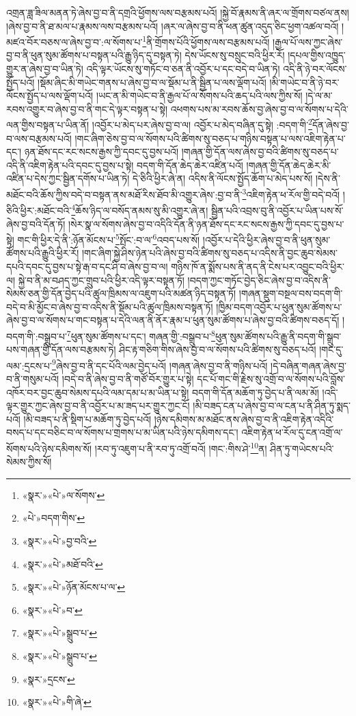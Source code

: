 འགྲན་ཟླ་ཟིལ་མནན་ཏེ་ཞེས་བྱ་བ་ནི་དགྲའི་ཕྱོགས་ལས་བརྩམས་པའོ། །སྐྱེ་བོ་རྣམས་ནི་ཞར་ལ་གྲོགས་བཙལ་ནས། །ཞེས་བྱ་བ་ནི་ཐ་མལ་པ་རྣམས་ལས་བརྩམས་པའོ། །ཞར་ལ་ཞེས་བྱ་བ་ནི་ཕན་ཚུན་འདུད་ཅིང་ཕྱག་འཚལ་བའོ། །མཛའ་བོར་བཅས་ལ་ཞེས་བྱ་བ་:ལ་སོགས་པ་\footnote{«སྣར་»«པེ་»ལ་སོགས་}ནི་གྲོགས་པོའི་ཕྱོགས་ལས་བརྩམས་པའོ། །རྒྱལ་པོ་ལས་ཀྱང་ཞེས་བྱ་བ་ནི་ཕུན་སུམ་ཚོགས་པ་བསྟན་པའི་རྒྱུ་ཉིད་དུ་བསྟན་ཏེ། དེས་ཡོངས་སུ་བསྲུང་བའི་ཕྱིར་རོ། །དཔལ་གྱིས་འཁྱུད་གྱུར་ན་ཞེས་བྱ་བ་ཡིན་ཏེ། འདི་ལྟར་ཡོངས་སུ་གཏོང་བ་ཅན་ནི་འབྱོར་པ་དང་བདེ་བ་ཡིན་ཏེ། འདི་ནི་ཉེ་བར་ལོངས་སྤྱོད་པའོ། །སྡོམ་ཞིང་མི་གཡེང་གནས་པ་ཞེས་བྱ་བ་ལ་སྡོམ་པ་ནི་སྦྱིན་པ་ལས་ལྡོག་པའོ། །མི་གཡེང་བ་ནི་ཉེ་བར་ལོངས་སྤྱོད་པ་ལས་ལྡོག་པའོ། །ཡང་ན་མི་གཡེང་བ་ནི་རྒྱལ་པོ་ལ་སོགས་པའི་ཆད་པའི་ལས་ཀྱིས་སོ། །དེ་ལ་མ་རབས་འགྱུར་བ་ཞེས་བྱ་བ་ནི་གང་དེ་ལྟར་བསྟན་པ་སྟེ། འཕགས་པས་མ་རབས་ཆོས་བྱ་ཞེས་བྱ་བ་ལ་སོགས་པ་དེའི་ལན་གྱིས་བསྟན་པ་ཡིན་ནོ། །འབྱོར་པ་མེད་པར་ཞེས་བྱ་བ་ལ། འབྱོར་པ་མེད་བཞིན་དུ་སྟེ། :བདག་གི་\footnote{«པེ་»བདག་གིས་}དོན་ཞེས་བྱ་བ་ལས་བརྩམས་པའོ། །གང་ཞིག་ཅེས་བྱ་བ་ལ་སོགས་པའི་ཚིགས་སུ་བཅད་པ་གཉིས་བསྟན་པ་ལས་འཇིག་རྟེན་པ་དང་། ཉན་ཐོས་དང་རང་སངས་རྒྱས་ཀྱི་དབང་དུ་བྱས་པའོ། །གཞན་གྱི་དོན་ལས་ཞེས་བྱ་བའི་ཚིགས་སུ་བཅད་པ་འདི་ནི་འཇིག་རྟེན་པའི་དབང་དུ་བྱས་པ་སྟེ། བདག་གི་དོན་ཆེད་ཆེར་འཛིན་པའོ། །གཞན་གྱི་དོན་ཆེད་ཆེར་མི་འཛིན་པ་དེས་ཀྱང་སྦྱིན་དགོས་པ་ཡིན་ཏེ། དེ་ཅིའི་ཕྱིར་ཞེ་ན། འདིས་ནི་ལོངས་སྤྱོད་ཆོག་པ་མེད་པས་སོ། །དེས་ནི་མཐོང་བའི་ཆོས་ཀྱིས་བདེ་བ་བསྟན་ནས་མཐོ་རིས་ཐོབ་མི་འགྱུར་ཞེས་:བྱ་བ་ནི་\footnote{«སྣར་»«པེ་»བྱ་བའི་}འཇིག་རྟེན་ཕ་རོལ་གྱི་བདེ་བའོ། །ཅིའི་ཕྱིར་:མཐོང་བའི་\footnote{«སྣར་»«པེ་»མཐོ་བའི་}ཆོས་ཉིད་ལ་བསོད་ནམས་སུ་མི་འགྱུར་ཞེ་ན། སྦྱིན་པའི་འབྲས་བུ་ནི་འབྱོར་པ་ཡིན་པས་སོ་ཞེས་བྱ་བའི་དོན་ཏོ། །སེར་སྣ་ལ་སོགས་ཞེས་བྱ་བ་འདིའི་དོན་ནི་ཉན་ཐོས་དང་རང་སངས་རྒྱས་ཀྱི་དབང་དུ་བྱས་པ་སྟེ། གང་གི་ཕྱིར་དེ་ནི་:ཉོན་མོངས་པ་\footnote{«སྣར་»«པེ་»ཉོན་མོངས་པ་ལ་}སྤོང་:བ་ལ་\footnote{«སྣར་»«པེ་»བ་}འབད་པས་སོ། །འབྱོར་པ་དེའི་ཕྱིར་ཞེས་བྱ་བ་ནི་ཕུན་སུམ་ཚོགས་པའི་རྒྱུའི་ཕྱིར་རོ། །གང་ཞིག་སྐྱེ་ཤིས་ཉེན་པའི་ཞེས་བྱ་བའི་ཚིགས་སུ་བཅད་པ་འདིས་ནི་བྱང་ཆུབ་སེམས་དཔའི་དབང་དུ་བྱས་པ་སྟེ་རྒ་བ་དང་ཤི་བ་ཞེས་བྱ་བ་ལ། གཉིས་ཁོ་ན་སྨོས་པས་ནི་ནད་ནི་ངེས་པར་འབྱུང་བའི་ཕྱིར་ལ། སྐྱེ་བ་ནི་མ་བཤད་ཀྱང་གྲུབ་པའི་ཕྱིར་འདི་ལྟར་བསྟན་ཏོ། །བདག་ཀྱང་གཏོང་བྱེད་ཅིང་ཞེས་བྱ་བ་འདིས་ནི་སེམས་ཅན་གྱི་དོན་བྱེད་པའི་ཚུལ་ཁྲིམས་ལ་འཇུག་པའི་མཚན་ཉིད་བསྟན་ཏོ། །གཞན་སྡུག་བསྔལ་བས་བདག་གི་བདེ་བ་མི་མྱོང་བ་ཞེས་བྱ་བ་འདིས་ནི་སྡོམ་པའི་ཚུལ་ཁྲིམས་བསྟན་ཏོ། །ཁྱིམ་བདག་འབྱོར་པ་ཕུན་སུམ་ཚོགས་པ་ཞེས་བྱ་བ་ལ་སོགས་པ་གང་བསྟན་པ་དེའི་ལན་ནི་ནོར་རྣམ་པ་ཕུན་སུམ་ཚོགས་པ་ཞེས་བྱ་བའི་ཚིགས་བཅད་དོ། །བདག་གི་:བསྒྲུབ་པ་\footnote{«སྣར་»«པེ་»སྒྲུབ་པ་}ཕུན་སུམ་ཚོགས་པ་དང་། གཞན་གྱི་:བསྒྲུབ་པ་\footnote{«སྣར་»«པེ་»སྒྲུབ་པ་}ཕུན་སུམ་ཚོགས་པའི་རྒྱུ་ནི་བདག་གི་སྒྲུབ་པས་གཞན་གྱི་དོན་ལས་བརྩམས་ཏེ། ཤིང་རྟ་གཅིག་གིས་ཞེས་བྱ་བ་ལ་སོགས་པའི་ཚིགས་སུ་བཅད་པའོ། །གང་དུ་ལམ་:དྲངས་པ་\footnote{«སྣར་»དྲངས་}ཞེས་བྱ་བ་ནི་དང་པོའི་ལམ་བྱེད་པའོ། །གཞན་ཞེས་བྱ་བ་ནི་གཉིས་པའོ། །དེ་བཞིན་གཞན་ཞེས་བྱ་བ་ནི་གསུམ་པའོ། །བདེ་བ་ནི་ཞེས་བྱ་བ་ནི་གཙོ་བོར་གྱུར་པ་སྟེ། དང་པོ་གང་གི་རྗེས་སུ་འགྲོ་བ་ལ་སོགས་པའི་བློས་འཁོར་བར་བྱང་ཆུབ་སེམས་དཔའི་ལམ་དམ་པ་མ་ཡིན་པ་སྟེ། བདག་གི་དོན་མཆོག་ཏུ་བྱེད་པ་ནི་ལམ་མོ། །འདི་ལྟར་གྱུར་ཀྱང་ཞེས་བྱ་བ་ནི་འབྱོར་པ་མ་ཟད་པར་གྱུར་ཀྱང་ངོ། །མི་བཟད་ངན་པ་ཞེས་བྱ་བ་ལ་ངན་པ་ནི་ཤིན་ཏུ་སྨད་པའོ། །མི་བཟད་པ་ནི་སྡིག་པ་མཆོག་ཏུ་བྱེད་པའོ། །ཉེས་དམིགས་མ་མཐོང་ནས་ཞེས་བྱ་བ་ནི་འཇིག་རྟེན་འདིའི་བསད་པ་དང་བཅིང་བ་ལ་སོགས་པ་གྲགས་པ་མ་ཡིན་པའི་ཉེས་དམིགས་དང་། འཇིག་རྟེན་ཕ་རོལ་དུ་ངན་འགྲོ་ལ་སོགས་པའི་ཉེས་དམིགས་སོ། །རབ་ཏུ་འཇུག་པ་ནི་རབ་ཏུ་འགྲོ་བའོ། །གང་:གིས་ཤེ་\footnote{«སྣར་»«པེ་»གི་ཞེ་}ན། ཤིན་ཏུ་གཡེངས་པའི་སེམས་ཀྱིས་སོ། 